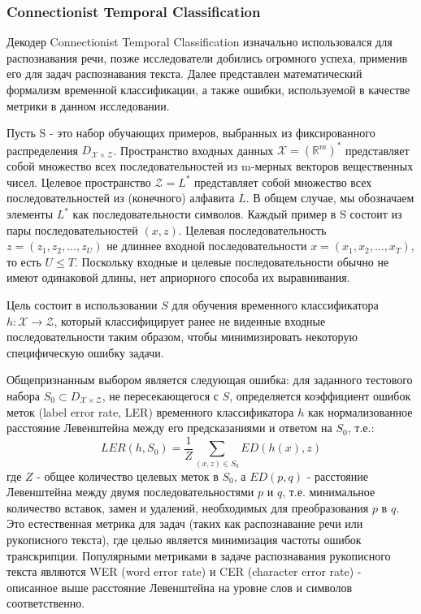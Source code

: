 \subsubsection{Connectionist Temporal Classification}
Декодер Connectionist Temporal Classification изначально использовался для распознавания речи, позже исследователи добились огромного успеха, применив его для задач распознавания текста. Далее представлен математический формализм временной классификации, а также ошибки, используемой в качестве метрики в данном исследовании.

Пусть S - это набор обучающих примеров, выбранных из фиксированного распределения $D_{\mathcal{X} \times \mathcal{Z}}$. Пространство входных данных $\mathcal{X} = (\mathbb{R}^m)^*$ представляет собой множество всех последовательностей из m-мерных векторов вещественных чисел. Целевое пространство $\mathcal{Z} = L^*$ представляет собой множество всех последовательностей из (конечного) алфавита $L$. В общем случае, мы обозначаем элементы $L^*$ как последовательности символов. Каждый пример в S состоит из пары последовательностей $(x, z)$. Целевая последовательность $z = (z_1, z_2, ..., z_U)$ не длиннее входной последовательности $x = (x_1, x_2, ..., x_T)$, то есть $U \leq T$. Поскольку входные и целевые последовательности обычно не имеют одинаковой длины, нет априорного способа их выравнивания.

Цель состоит в использовании $S$ для обучения временного классификатора $h : \mathcal{X} \rightarrow \mathcal{Z}$, который классифицирует ранее не виденные входные последовательности таким образом, чтобы минимизировать некоторую специфическую ошибку задачи.

Общепризнанным выбором является следующая ошибка: для заданного тестового набора $S_0 \subset D_{\mathcal{X} \times \mathcal{Z}}$, не пересекающегося с $S$, определяется коэффициент ошибок меток (label error rate, LER) временного классификатора $h$ как нормализованное расстояние Левенштейна между его предсказаниями и ответом на $S_0$, т.е.:
\begin{equation}
	LER(h, S_0) = \frac{1}{Z} \sum_{(x,z) \in S_0} ED(h(x), z)
\end{equation}
где $Z$ - общее количество целевых меток в $S_0$, а $ED(p, q)$ - расстояние Левенштейна между двумя последовательностями $p$ и $q$, т.е. минимальное количество вставок, замен и удалений, необходимых для преобразования $p$ в $q$.
Это естественная метрика для задач (таких как распознавание речи или рукописного текста), где целью является минимизация частоты ошибок транскрипции. Популярными метриками в задаче распознавания рукописного текста являются WER (word error rate) и CER (character error rate) - описанное выше расстояние Левенштейна на уровне слов и символов соответственно.


